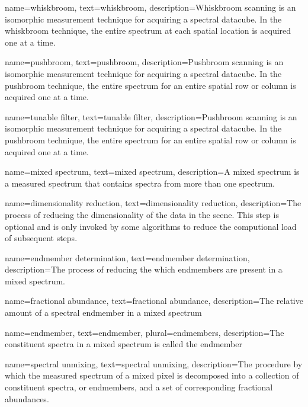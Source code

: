 {
name={whiskbroom},
text={whiskbroom},
description={Whiskbroom scanning is an isomorphic measurement technique for acquiring a spectral datacube. In the whiskbroom technique, the entire spectrum at each spatial location is acquired one at a time.}
}

{
name={pushbroom},
text={pushbroom},
description={Pushbroom scanning is an isomorphic measurement technique for acquiring a spectral datacube. In the pushbroom technique, the entire spectrum for an entire spatial row or column is acquired one at a time.}
}


{
name={tunable filter},
text={tunable filter},
description={Pushbroom scanning is an isomorphic measurement technique for acquiring a spectral datacube. In the pushbroom technique, the entire spectrum for an entire spatial row or column is acquired one at a time.}
}

{
name={mixed spectrum},
text={mixed spectrum},
description={A mixed spectrum is a measured spectrum that contains spectra from more than one spectrum.}
}

{
name={dimensionality reduction},
text={dimensionality reduction},
description={The process of reducing the dimensionality of the data in the scene. This step is optional and is only invoked by some algorithms to reduce the computional load of subsequent steps. }
}

{
name={endmember determination},
text={endmember determination},
description={The process of reducing the which endmembers are present in a mixed spectrum. }
}

{
name={fractional abundance},
text={fractional abundance},
description={The relative amount of a spectral endmember in a mixed spectrum}
}

{
name={endmember},
text={endmember},
plural={endmembers},
description={The constituent spectra in a mixed spectrum is called the endmember}
}

{
name={spectral unmixing},
text={spectral unmixing},
description={The procedure by which the measured spectrum of a mixed pixel is decomposed into a collection of constituent spectra, or \glspl{endmember}, and a set of corresponding \glspl{fractional abundance}.}
}


